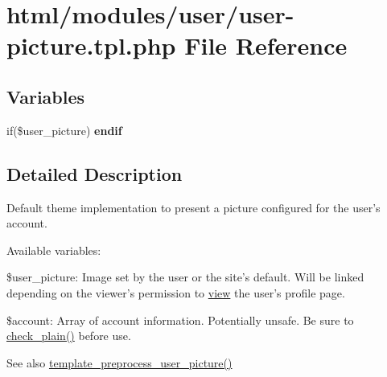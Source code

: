 \hypertarget{user-picture_8tpl_8php}{
\section{html/modules/user/user-\/picture.tpl.php File Reference}
\label{user-picture_8tpl_8php}
}
\subsection*{Variables}
\begin{DoxyCompactItemize}
\item 
\hypertarget{user-picture_8tpl_8php_a5108ce26a5144f90a8fbc964497b026f}{
if(\$user\_\-picture) {\bfseries endif}}
\label{user-picture_8tpl_8php_a5108ce26a5144f90a8fbc964497b026f}

\end{DoxyCompactItemize}


\subsection{Detailed Description}
Default theme implementation to present a picture configured for the user's account.

Available variables:
\begin{DoxyItemize}
\item \$user\_\-picture: Image set by the user or the site's default. Will be linked depending on the viewer's permission to \hyperlink{classview}{view} the user's profile page.
\item \$account: Array of account information. Potentially unsafe. Be sure to \hyperlink{group__sanitization_ga76fc67a30fd8d75ddd80565e6e65a13d}{check\_\-plain()} before use.
\end{DoxyItemize}

\begin{DoxySeeAlso}{See also}
\hyperlink{user_8module_aa1d7397dce93911938b4edbfee69ceb4}{template\_\-preprocess\_\-user\_\-picture()} 
\end{DoxySeeAlso}
